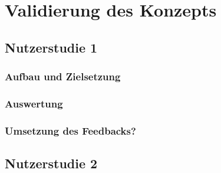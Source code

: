 \chapter{Validierung des Konzepts}\label{cha:ValidierungDesKonzepts}
\cite{1}
\newline
\cite{2}
\newline
\cite{3}
\newline
\cite{4}
\newline
\cite{1}
\newline
\cite{1}
\newline
\cite{1}
\newline
\cite{1}
\newline
\cite{1}
\newline
\cite{1}
\newline
\cite{1}
\newline
\cite{1}
\newline
\cite{1}
\newline
\cite{1}
\newline
\cite{1}
\newline
\cite{1}
\newline
\section{Nutzerstudie 1}\label{sec:Nutzerstudie1}

\subsection{Aufbau und Zielsetzung}\label{sec:AufbauNutzerstudie1}

\subsection{Auswertung}\label{sec:AuswertungNutzerStudie1}

\subsection{Umsetzung des Feedbacks?}\label{sec:UmsetzungFeedbackNutzerstudie1}

\section{Nutzerstudie 2}\label{sec:Nutzerstudie2}

